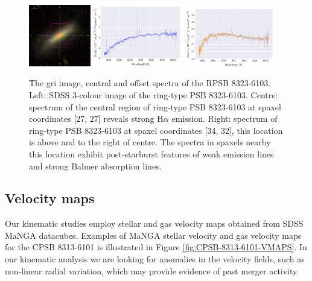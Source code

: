 \begin{figure}
    \centering
    \includegraphics[width=0.24\textwidth]{images/Cutouts/RPSB-8323-6103-IM.png}
    \hfill
    \includegraphics[width=0.35\textwidth]{images/Spectra/RPSB-8323-6103-27-27.png}
    \hfill
    \includegraphics[width=0.35\textwidth]{images/Spectra/RPSB-8323-6103-34-32.png}
    \caption[Image and central and offset spectra of the RPSB 8323-6103]{The gri image, central and offset spectra of the RPSB 8323-6103. Left: SDSS 3-colour image of the ring-type PSB 8323-6103. 
    Centre: spectrum of the central region of ring-type PSB 8323-6103 at spaxel coordinates [27, 27] reveals strong H$\alpha$ emission. 
    Right: spectrum of ring-type PSB 8323-6103 at spaxel coordinates [34, 32], this location is above and to the right of centre. The spectra in spaxels nearby this location exhibit post-starburst features of weak emission lines and strong Balmer absorption lines.}
    \label{fig:RPSB-8323-6103-spec}
\end{figure}

\subsection{Velocity maps}
Our kinematic studies employ stellar and gas velocity maps obtained from SDSS MaNGA datacubes. Examples of MaNGA stellar velocity and gas velocity maps for the CPSB 8313-6101 is illustrated in Figure \ref{fig:CPSB-8313-6101-VMAPS}. In our kinematic analysis we are looking for anomalies in the velocity fields, such as non-linear radial variation, which may provide evidence of past merger activity.

